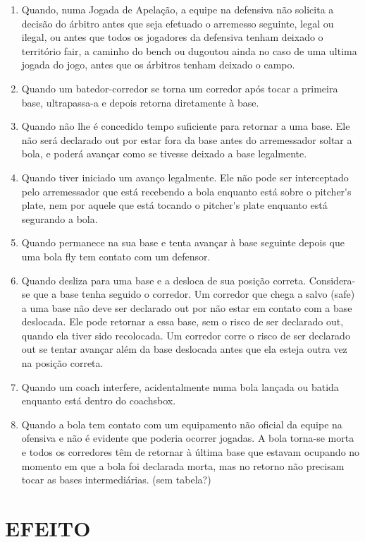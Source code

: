 \begin{enumerate}[label=(\alph*)]
	\item  Quando, numa Jogada de Apelação, a equipe na defensiva não solicita a decisão do árbitro antes que seja efetuado o arremesso seguinte, legal ou ilegal, ou antes que todos os jogadores da defensiva tenham deixado o território \gls{fair}, a caminho do \gls{bench} ou \gls{dugout}ou ainda no caso de uma ultima jogada do jogo, antes que os árbitros tenham deixado o campo.
	\item   Quando um batedor-corredor se torna um corredor após tocar a primeira base, ultrapassa-a e depois retorna diretamente à base.
	\item   Quando não lhe é concedido tempo suficiente para retornar a uma base. Ele não será declarado \gls{out} por estar fora da base antes do arremessador soltar a bola, e poderá avançar como se tivesse deixado a base legalmente.

	\item Quando tiver iniciado um avanço legalmente. Ele não pode ser interceptado pelo arremessador que está recebendo a bola enquanto está sobre o \gls{pitcher's plate}, nem por aquele que está tocando o \gls{pitcher's plate} enquanto está segurando a bola.
	\item  Quando permanece na sua base e tenta avançar à base seguinte depois que uma bola \gls{fly} tem contato com um defensor.
	\item  Quando desliza para uma base e a desloca de sua posição correta. Considera-se que a base tenha seguido o corredor. Um corredor que chega a salvo (\gls{safe}) a uma base não deve ser declarado \gls{out} por não estar em contato com a base deslocada. Ele pode retornar a essa base, sem o risco de ser declarado \gls{out}, quando ela tiver sido recolocada. Um corredor corre o risco de ser declarado \gls{out} se tentar avançar além da base deslocada antes que ela esteja outra vez na posição correta.
	\item  Quando um \gls{coach} interfere, acidentalmente numa bola lançada ou batida enquanto está dentro do \gls{coachsbox}.
	\item  Quando a bola tem contato com um equipamento não oficial da equipe na ofensiva e não é evidente que poderia ocorrer jogadas. A bola torna-se morta e todos os corredores têm de retornar à última base que estavam ocupando no momento em que a bola foi declarada morta, mas no retorno não precisam tocar as bases intermediárias. (sem tabela?)
\end{enumerate}

\section*{EFEITO}

